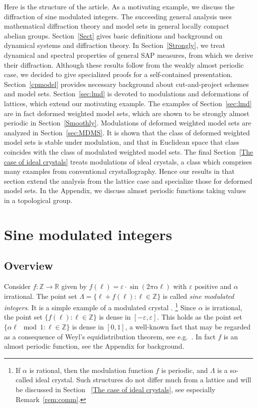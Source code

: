 \documentclass[11pt, a4wide]{amsart}
\numberwithin{lemma}{section}
\begin{document}
Here is the structure of the article. As a motivating example, we discuss the diffraction of sine modulated integers. The succeeding general analysis uses mathematical diffraction theory and model sets in general locally compact abelian groups. Section~\ref{Sect} gives basic definitions and background on dynamical systems and diffraction theory. 
In Section~\ref{Strongly}, we treat dynamical and spectral properties of general SAP measures, from which we derive their diffraction. Although these results follow from the weakly almost periodic case, we decided to give specialized proofs for a self-contained presentation. Section~\ref{cpmodel} provides necessary background about cut-and-project schemes and model sets. Section~\ref{sec:lmd} is devoted to modulations and deformations of lattices, which extend our motivating example. The examples of Section~\ref{sec:lmd} are in fact deformed weighted model sets, which are shown to be  strongly almost periodic in Section~\ref{Smoothly}. 
Modulations of deformed weighted model sets are analyzed in
Section~\ref{sec:MDMS}. It is shown that the class of deformed weighted model sets is stable under modulation, and that in Euclidean space that class coincides with the class of modulated weighted model sets.
The final Section~\ref{The case of ideal crystals} treats modulations of ideal crystals, a class which comprises many examples from conventional crystallography. Hence our results in that section extend the analysis from the lattice case and specialize those for deformed model sets. In the Appendix, we discuss almost periodic functions taking values in a topological group.





\section{Sine modulated integers}\label{sec:sinemod}


\subsection{Overview}

Consider $f:\mathbb Z\to \mathbb R$ given by $f(\ell)=\varepsilon\cdot \sin(2\pi\alpha \ell)$ with $\varepsilon$ positive and $\alpha$ irrational. The point set $\Lambda=\{\ell+f(\ell): \ell\in\mathbb Z\}$ is called \textit{sine modulated integers}. It is a simple example of a modulated crystal \cite[Sec.~3.3]{JJ14}.%
\footnote{If $\alpha$ is rational, then the modulation function $f$ is periodic, and $\Lambda$ is a so-called ideal crystal. Such structures do not differ much from a lattice and will be discussed in Section~ \ref{The case of ideal crystals}, see especially Remark~\ref{rem:comm}.}
%
Since $\alpha$ is irrational, the point set $\{f(\ell): \ell\in\mathbb Z\}$ is dense in $[-\varepsilon,\varepsilon]$. This holds as the point set $\{\alpha \ell \mod 1: \ell\in\mathbb Z\}$ is dense in $[0,1]$, a well-known fact that may be regarded as a consequence of Weyl's equidistribution theorem, see e.g.~\cite[Ch.~1, Ex.~2.1]{KN74}. In fact $f$ is an almost periodic function, see the Appendix for background.
\end{document}
